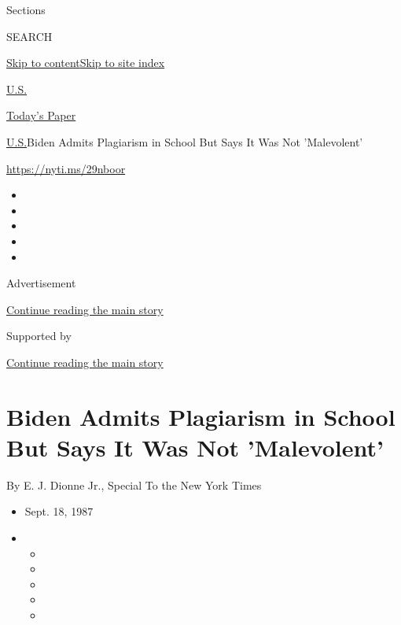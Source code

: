 Sections

SEARCH

\protect\hyperlink{site-content}{Skip to
content}\protect\hyperlink{site-index}{Skip to site index}

\href{https://www.nytimes3xbfgragh.onion/section/us}{U.S.}

\href{https://myaccount.nytimes3xbfgragh.onion/auth/login?response_type=cookie\&client_id=vi}{}

\href{https://www.nytimes3xbfgragh.onion/section/todayspaper}{Today's
Paper}

\href{/section/us}{U.S.}\textbar{}Biden Admits Plagiarism in School But
Says It Was Not 'Malevolent'

\url{https://nyti.ms/29nboor}

\begin{itemize}
\item
\item
\item
\item
\item
\end{itemize}

Advertisement

\protect\hyperlink{after-top}{Continue reading the main story}

Supported by

\protect\hyperlink{after-sponsor}{Continue reading the main story}

\hypertarget{biden-admits-plagiarism-in-school-but-says-it-was-not-malevolent}{%
\section{Biden Admits Plagiarism in School But Says It Was Not
'Malevolent'}\label{biden-admits-plagiarism-in-school-but-says-it-was-not-malevolent}}

By E. J. Dionne Jr., Special To the New York Times

\begin{itemize}
\item
  Sept. 18, 1987
\item
  \begin{itemize}
  \item
  \item
  \item
  \item
  \item
  \end{itemize}
\end{itemize}

